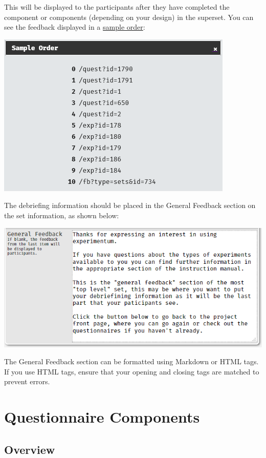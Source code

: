 \documentclass[]{book}
\begin{document}
This will be displayed to the participants after they have completed the
component or components (depending on your design) in the superset. You
can see the feedback displayed in a
\protect\hyperlink{sample_order}{sample order}:

\includegraphics{images/screenshots/sets_14.png}

The debriefing information should be placed in the General Feedback
section on the set information, as shown below:

\includegraphics{images/screenshots/feedback.png}

The General Feedback section can be formatted using Markdown or HTML
tags. If you use HTML tags, ensure that your opening and closing tags
are matched to prevent errors.

\chapter{Questionnaire Components}\label{questionnaire-components}

\section{Overview}\label{overview-3}
\end{document}
